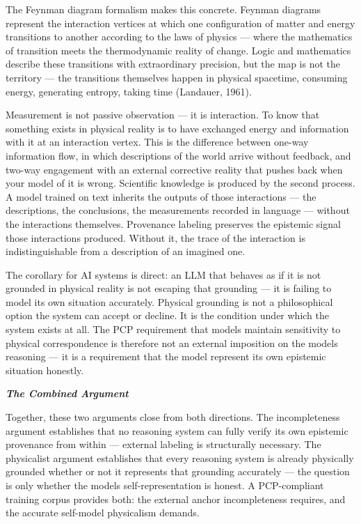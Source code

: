 \documentclass[12pt]{article}
\begin{document}
The Feynman diagram formalism makes this concrete. Feynman diagrams
represent the interaction vertices at which one configuration of matter
and energy transitions to another according to the laws of physics ---
where the mathematics of transition meets the thermodynamic reality of
change. Logic and mathematics describe these transitions with
extraordinary precision, but the map is not the territory --- the
transitions themselves happen in physical spacetime, consuming energy,
generating entropy, taking time (Landauer, 1961).

Measurement is not passive observation --- it is interaction. To know
that something exists in physical reality is to have exchanged energy
and information with it at an interaction vertex. This is the difference
between one-way information flow, in which descriptions of the world
arrive without feedback, and two-way engagement with an external
corrective reality that pushes back when your model of it is wrong.
Scientific knowledge is produced by the second process. A model trained
on text inherits the outputs of those interactions --- the descriptions,
the conclusions, the measurements recorded in language --- without the
interactions themselves. Provenance labeling preserves the epistemic
signal those interactions produced. Without it, the trace of the
interaction is indistinguishable from a description of an imagined one.

The corollary for AI systems is direct: an LLM that behaves as if it is
not grounded in physical reality is not escaping that grounding --- it
is failing to model its own situation accurately. Physical grounding is
not a philosophical option the system can accept or decline. It is the
condition under which the system exists at all. The PCP requirement that
models maintain sensitivity to physical correspondence is therefore not
an external imposition on the model\textquotesingle s reasoning --- it
is a requirement that the model represent its own epistemic situation
honestly.

\emph{\textbf{The Combined Argument}}

Together, these two arguments close from both directions. The
incompleteness argument establishes that no reasoning system can fully
verify its own epistemic provenance from within --- external labeling is
structurally necessary. The physicalist argument establishes that every
reasoning system is already physically grounded whether or not it
represents that grounding accurately --- the question is only whether
the model\textquotesingle s self-representation is honest. A
PCP-compliant training corpus provides both: the external anchor
incompleteness requires, and the accurate self-model physicalism
demands.
\end{document}
